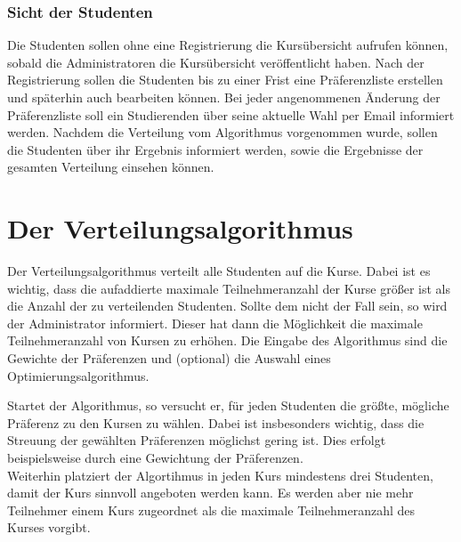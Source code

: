                 
            \subsubsection{Sicht der Studenten}
                Die Studenten sollen ohne eine Registrierung die Kursübersicht aufrufen können, sobald die Administratoren die Kursübersicht veröffentlicht haben.
                Nach der Registrierung sollen die Studenten bis zu einer Frist eine Präferenzliste erstellen und späterhin auch bearbeiten können.
                Bei jeder angenommenen Änderung der Präferenzliste soll ein Studierenden über seine aktuelle Wahl per Email informiert werden.
                Nachdem die Verteilung vom Algorithmus vorgenommen wurde, sollen die Studenten über ihr Ergebnis informiert werden, sowie die Ergebnisse der gesamten Verteilung einsehen können.
    
    
    
    
            
    
    \section{Der Verteilungsalgorithmus}
    Der Verteilungsalgorithmus verteilt alle Studenten auf die Kurse.
    Dabei ist es wichtig, dass die aufaddierte maximale Teilnehmeranzahl der Kurse größer ist als die Anzahl der zu verteilenden Studenten.
    Sollte dem nicht der Fall sein, so wird der Administrator informiert.
    Dieser hat dann die Möglichkeit die maximale Teilnehmeranzahl von Kursen zu erhöhen.
    Die Eingabe des Algorithmus sind die Gewichte der Präferenzen und (optional) die Auswahl eines Optimierungsalgorithmus.
    
    Startet der Algorithmus, so versucht er, für jeden Studenten die größte, mögliche Präferenz zu den Kursen zu wählen.
    Dabei ist insbesonders wichtig, dass die Streuung der gewählten Präferenzen möglichst gering ist.
    Dies erfolgt beispielsweise durch eine Gewichtung der Präferenzen.\\
    Weiterhin platziert der Algortihmus in jeden Kurs mindestens drei Studenten, damit der Kurs sinnvoll angeboten werden kann.
    Es werden aber nie mehr Teilnehmer einem Kurs zugeordnet als die maximale Teilnehmeranzahl des Kurses vorgibt.
    
